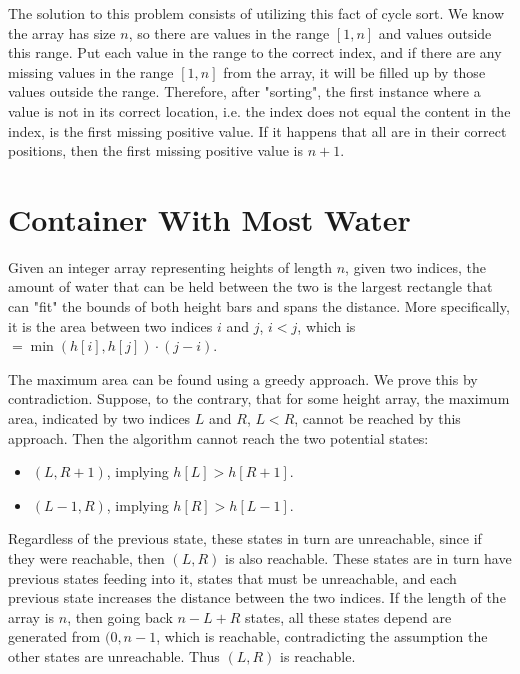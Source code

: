 \documentclass{article}
\begin{document}
The solution to this problem consists of utilizing this fact of cycle sort. We know the array has size \( n \), so there are values in the range \( [1, n] \) and values outside this range. Put each value in the range to the correct index, and if there are any missing values in the range \( [1, n] \) from the array, it will be filled up by those values outside the range. Therefore, after "sorting", the first instance where a value is not in its correct location, i.e. the index does not equal the content in the index, is the first missing positive value. If it happens that all are in their correct positions, then the first missing positive value is \( n + 1 \).

\section*{Container With Most Water}

Given an integer array representing heights of length \( n \), given two indices, the amount of water that can be held between the two is the largest rectangle that can "fit" the bounds of both height bars and spans the distance. More specifically, it is the area between two indices \( i \) and \( j \), \( i < j \), which is \( = \min(h[i], h[j]) \cdot (j - i) \).

The maximum area can be found using a greedy approach. We prove this by contradiction. Suppose, to the contrary, that for some height array, the maximum area, indicated by two indices \( L \) and \( R \), \( L < R \), cannot be reached by this approach. Then the algorithm cannot reach the two potential states:
\begin{itemize}
\item \( (L, R + 1) \), implying \( h[L] > h[R + 1] \).
\item \( (L - 1, R) \), implying \( h[R] > h[L - 1] \).
\end{itemize}
Regardless of the previous state, these states in turn are unreachable, since if they were reachable, then \( (L, R) \) is also reachable. These states are in turn have previous states feeding into it, states that must be unreachable, and each previous state increases the distance between the two indices. If the length of the array is \( n \), then going back \( n - L + R \) states, all these states depend are generated from \( (0, n-1\), which is reachable, contradicting the assumption the other states are unreachable. Thus \( (L, R) \) is reachable.

\section*{}
\end{document}
